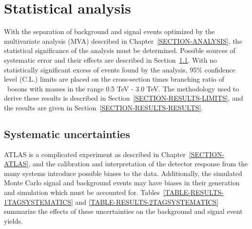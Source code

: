 \chapter{Statistical analysis}
\label{SECTION-RESULTS}
With the separation of background and signal events optimized by the multivariate analysis (MVA) described in Chapter~\ref{SECTION-ANALYSIS}, the statistical significance of the analysis must be determined. Possible sources of systematic error and their effects are described in Section~\ref{SECTION-RESULTS-SYSTEMATICS}. With no statistically significant excess of events found by the analysis, 95$\%$ confidence level (C.L.) limits are placed on the cross-section times branching ratio of \Wprime\ bosons with masses in the range 0.5 TeV - 3.0 TeV. The methodology used to derive these results is described in Section~\ref{SECTION-RESULTS-LIMITS}, and the results are given in Section~\ref{SECTION-RESULTS-RESULTS}.

\section{Systematic uncertainties}
\label{SECTION-RESULTS-SYSTEMATICS}
ATLAS is a complicated experiment as described in Chapter~\ref{SECTION-ATLAS}, and the calibration and interpretation of the detector response from the many systems introduce possible biases to the data. Additionally, the simulated Monte Carlo signal and background events may have biases in their generation and simulation which must be accounted for. Tables~\ref{TABLE-RESULTS-1TAGSYSTEMATICS} and \ref{TABLE-RESULTS-2TAGSYSTEMATICS} summarize the effects of these uncertainties on the background and signal event yields.

